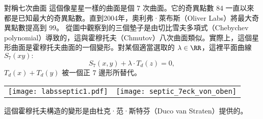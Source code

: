 \begin{surferPage}[七次曲面]{對稱七次曲面}
這個像星星一樣的曲面是個 $7$ 次曲面。它的奇異點數 $84$ 一直以來都是已知最大的奇異點數。直到2004年，奧利弗·萊布斯（Oliver Labs）將最大奇異點數提高到 $99$。
從圖中觀察到的三個墊子是由切比雪夫多項式（Chebychev polynomial）導致的，這與霍穆托夫（Chmutov）八次曲面類似。實際上，這個星形曲面是霍穆托夫曲面的一個變形。對某個適當選取的 $\lambda\in\RR$，這裡平面曲線 $S_7(xy):$
\[S_7(x,y) + \lambda \cdot T_d(z) = 0,\]
$T_d(x)+T_d(y)$ 被一個正 $7$ 邊形所替代。
\vspace*{-0.3em}
    \begin{center}
      \begin{tabular}{c@{\qquad}c}
        \texttt{[image: labsseptic1.pdf]}
        &
        \texttt{[image: septic\_7eck\_von\_oben]}
      \end{tabular}
    \end{center}
    \vspace*{-0.3em}
這個霍穆托夫構造的變形是由杜克·范·斯特芬（Duco van Straten）提供的。
\end{surferPage}
